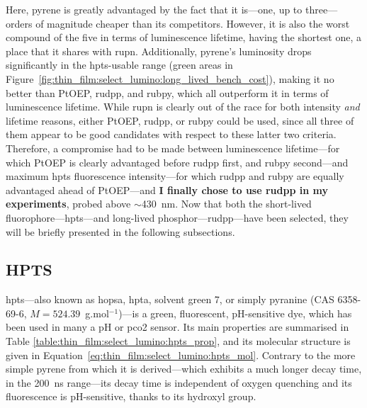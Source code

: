 Here, pyrene is greatly advantaged by the fact that it is---one, up to three---orders of magnitude cheaper than its competitors. However, it is also the worst compound of the five in terms of luminescence lifetime, having the shortest one, a place that it shares with \gls{rupn}. Additionally, pyrene's luminosity drops significantly in the \gls{hpts}-usable range (green areas in Figure~\ref{fig:thin_film:select_lumino:long_lived_bench_cost}), making it no better than PtOEP, \gls{rudpp}, and \gls{rubpy}, which all outperform it in terms of luminescence lifetime. While \gls{rupn} is clearly out of the race for both intensity \emph{and} lifetime reasons, either PtOEP, \gls{rudpp}, or \gls{rubpy} could be used, since all three of them appear to be good candidates with respect to these latter two criteria. Therefore, a compromise had to be made between luminescence lifetime---for which PtOEP is clearly advantaged before \gls{rudpp} first, and \gls{rubpy} second---and maximum \gls{hpts} fluorescence intensity---for which \gls{rudpp} and \gls{rubpy} are equally advantaged ahead of PtOEP---and \textbf{I finally chose to use \gls{rudpp} in my experiments}, probed above $\sim$430~nm. Now that both the short-lived fluorophore---\gls{hpts}---and long-lived phosphor---\gls{rudpp}---have been selected, they will be briefly presented in the following subsections.


\subsection{HPTS}\label{subsect:thin_film:select_lumino:hpts}

\gls{hpts}---also known as \gls{hopsa}, \gls{hpta}, solvent green 7, or simply pyranine (CAS 6358-69-6, $M=524.39$~g.mol$^{-1}$)---is a green, fluorescent, pH-sensitive dye, which has been used in many a pH or \gls{pco2} sensor\cite{wolfbeis2005, mills2009, dervieux2020dyereview}. Its main properties are summarised in Table \ref{table:thin_film:select_lumino:hpts_prop}, and its molecular structure is given in Equation~\ref{eq:thin_film:select_lumino:hpts_mol}. Contrary to the more simple pyrene from which it is derived---which exhibits a much longer decay time, in the 200~ns range\cite{wolfbeis1983}---its decay time is independent of oxygen quenching\cite{wolfbeis1983, schulman1995} and its fluorescence is pH-sensitive, thanks to its hydroxyl group.

